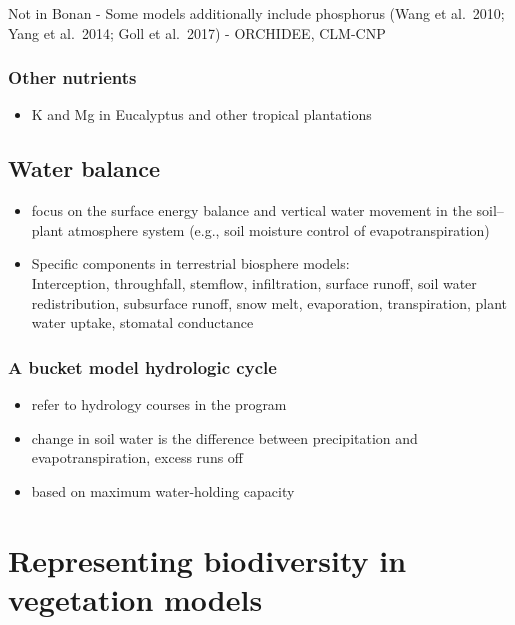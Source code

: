 \documentclass[
  oneside]{book}
\providecommand{\tightlist}{%
  \setlength{\itemsep}{0pt}\setlength{\parskip}{0pt}}
\begin{document}
Not in Bonan
- Some models additionally include phosphorus (Wang et al.~2010; Yang et al.~2014; Goll et al.~2017)
- ORCHIDEE, CLM-CNP

\hypertarget{other-nutrients}{%
\subsection{Other nutrients}\label{other-nutrients}}

\begin{itemize}
\tightlist
\item
  K and Mg in Eucalyptus and other tropical plantations
\end{itemize}

\hypertarget{water-balance}{%
\section{Water balance}\label{water-balance}}

\begin{itemize}
\item
  focus on the surface energy balance and vertical water movement in the soil--plant atmosphere system (e.g., soil moisture control of evapotranspiration)
\item
  Specific components in terrestrial biosphere models:\\
  Interception, throughfall, stemflow, infiltration, surface runoff, soil water redistribution, subsurface runoff, snow melt, evaporation, transpiration, plant water uptake, stomatal conductance
\end{itemize}

\hypertarget{a-bucket-model-hydrologic-cycle}{%
\subsection{A bucket model hydrologic cycle}\label{a-bucket-model-hydrologic-cycle}}

\begin{itemize}
\tightlist
\item
  refer to hydrology courses in the program
\item
  change in soil water is the difference between precipitation and evapotranspiration, excess runs off
\item
  based on maximum water-holding capacity
\end{itemize}

\hypertarget{representing-biodiversity-in-vegetation-models}{%
\chapter{Representing biodiversity in vegetation models}\label{representing-biodiversity-in-vegetation-models}}
\end{document}
